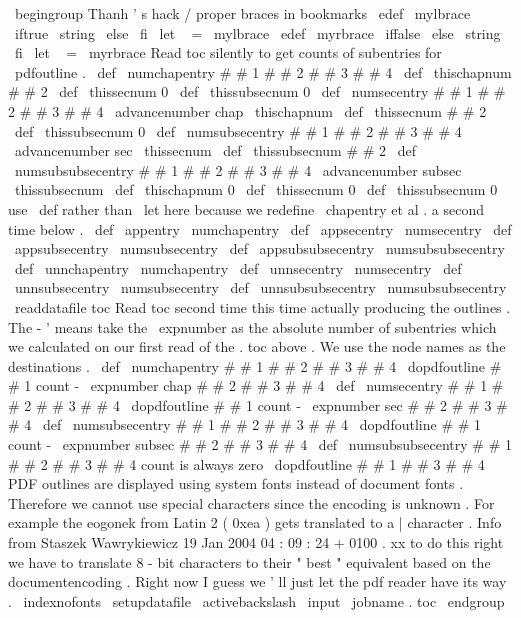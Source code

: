 {
%
\
begingroup
%
Thanh
'
s
hack
/
proper
braces
in
bookmarks
\
edef
\
mylbrace
{
\
iftrue
\
string
{
\
else
}
\
fi
}
\
let
\
{
=
\
mylbrace
\
edef
\
myrbrace
{
\
iffalse
{
\
else
\
string
}
\
fi
}
\
let
\
}
=
\
myrbrace
%
%
Read
toc
silently
to
get
counts
of
subentries
for
\
pdfoutline
.
\
def
\
numchapentry
#
#
1
#
#
2
#
#
3
#
#
4
{
%
\
def
\
thischapnum
{
#
#
2
}
%
\
def
\
thissecnum
{
0
}
%
\
def
\
thissubsecnum
{
0
}
%
}
%
\
def
\
numsecentry
#
#
1
#
#
2
#
#
3
#
#
4
{
%
\
advancenumber
{
chap
\
thischapnum
}
%
\
def
\
thissecnum
{
#
#
2
}
%
\
def
\
thissubsecnum
{
0
}
%
}
%
\
def
\
numsubsecentry
#
#
1
#
#
2
#
#
3
#
#
4
{
%
\
advancenumber
{
sec
\
thissecnum
}
%
\
def
\
thissubsecnum
{
#
#
2
}
%
}
%
\
def
\
numsubsubsecentry
#
#
1
#
#
2
#
#
3
#
#
4
{
%
\
advancenumber
{
subsec
\
thissubsecnum
}
%
}
%
\
def
\
thischapnum
{
0
}
%
\
def
\
thissecnum
{
0
}
%
\
def
\
thissubsecnum
{
0
}
%
%
%
use
\
def
rather
than
\
let
here
because
we
redefine
\
chapentry
et
%
al
.
a
second
time
below
.
\
def
\
appentry
{
\
numchapentry
}
%
\
def
\
appsecentry
{
\
numsecentry
}
%
\
def
\
appsubsecentry
{
\
numsubsecentry
}
%
\
def
\
appsubsubsecentry
{
\
numsubsubsecentry
}
%
\
def
\
unnchapentry
{
\
numchapentry
}
%
\
def
\
unnsecentry
{
\
numsecentry
}
%
\
def
\
unnsubsecentry
{
\
numsubsecentry
}
%
\
def
\
unnsubsubsecentry
{
\
numsubsubsecentry
}
%
\
readdatafile
{
toc
}
%
%
%
Read
toc
second
time
this
time
actually
producing
the
outlines
.
%
The
-
'
means
take
the
\
expnumber
as
the
absolute
number
of
%
subentries
which
we
calculated
on
our
first
read
of
the
.
toc
above
.
%
%
We
use
the
node
names
as
the
destinations
.
\
def
\
numchapentry
#
#
1
#
#
2
#
#
3
#
#
4
{
%
\
dopdfoutline
{
#
#
1
}
{
count
-
\
expnumber
{
chap
#
#
2
}
}
{
#
#
3
}
{
#
#
4
}
}
%
\
def
\
numsecentry
#
#
1
#
#
2
#
#
3
#
#
4
{
%
\
dopdfoutline
{
#
#
1
}
{
count
-
\
expnumber
{
sec
#
#
2
}
}
{
#
#
3
}
{
#
#
4
}
}
%
\
def
\
numsubsecentry
#
#
1
#
#
2
#
#
3
#
#
4
{
%
\
dopdfoutline
{
#
#
1
}
{
count
-
\
expnumber
{
subsec
#
#
2
}
}
{
#
#
3
}
{
#
#
4
}
}
%
\
def
\
numsubsubsecentry
#
#
1
#
#
2
#
#
3
#
#
4
{
%
count
is
always
zero
\
dopdfoutline
{
#
#
1
}
{
}
{
#
#
3
}
{
#
#
4
}
}
%
%
%
PDF
outlines
are
displayed
using
system
fonts
instead
of
%
document
fonts
.
Therefore
we
cannot
use
special
characters
%
since
the
encoding
is
unknown
.
For
example
the
eogonek
from
%
Latin
2
(
0xea
)
gets
translated
to
a
|
character
.
Info
from
%
Staszek
Wawrykiewicz
19
Jan
2004
04
:
09
:
24
+
0100
.
%
%
xx
to
do
this
right
we
have
to
translate
8
-
bit
characters
to
%
their
"
best
"
equivalent
based
on
the
documentencoding
.
Right
%
now
I
guess
we
'
ll
just
let
the
pdf
reader
have
its
way
.
\
indexnofonts
\
setupdatafile
\
activebackslash
\
input
\
jobname
.
toc
\
endgroup
}
